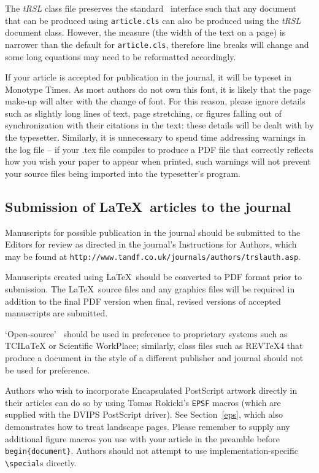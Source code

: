 \documentclass[]{tRSL2e}
\begin{document}
The \textit{tRSL} class file preserves the standard \LaTeXe\ interface such that any document that can
be produced using {\tt article.cls} can also be produced using the {\it tRSL} document class.
However, the measure (the width of the text on a page) is narrower than the default for {\tt article.cls}, therefore line breaks
will change and some long equations may need to be reformatted accordingly.

If your article is accepted for publication in the journal, it will be typeset in Monotype Times. As most authors do not own this font, it is likely that the page make-up will alter with the change of font. For this reason, please ignore details such as slightly long lines of text, page stretching, or figures falling out of synchronization with their citations in the text: these details will be dealt with by the typesetter. Similarly, it is unnecessary to spend time addressing warnings in the log file -- if your .tex file compiles to produce a PDF file that correctly reflects how you wish your paper to appear when printed, such warnings will not prevent your source files being imported into the typesetter's program.


\subsection{Submission of \LaTeX\ articles to the journal}\label{S1.2}

Manuscripts for possible publication in the journal should be submitted to the Editors for review as directed in the journal's Instructions for Authors, which may be found at {\tt{http://www.tandf.co.uk/journals/authors/trslauth.asp}}.

Manuscripts created using \LaTeX\ should be converted to PDF format prior to submission. The \LaTeX\ source files and any graphics files will be required in addition to the final PDF version when final, revised versions of accepted manuscripts are submitted.

`Open-source' \LaTeXe\ should be used in preference to proprietary systems such as TCILaTeX or Scientific WorkPlace; similarly, class files such as REVTeX4 that produce a document in the style of a different publisher and journal should not be used for preference.

Authors who wish to incorporate Encapsulated PostScript artwork directly in their articles can do so by using
Tomas Rokicki's {\tt EPSF} macros (which are supplied with the DVIPS PostScript driver). See Section~\ref{eps},
which also demonstrates how to treat landscape pages. Please remember to supply any additional figure macros you
use with your article in the preamble before \verb"begin{document}". Authors should not attempt to use
implementation-specific \verb"\special"s directly.
\end{document}
